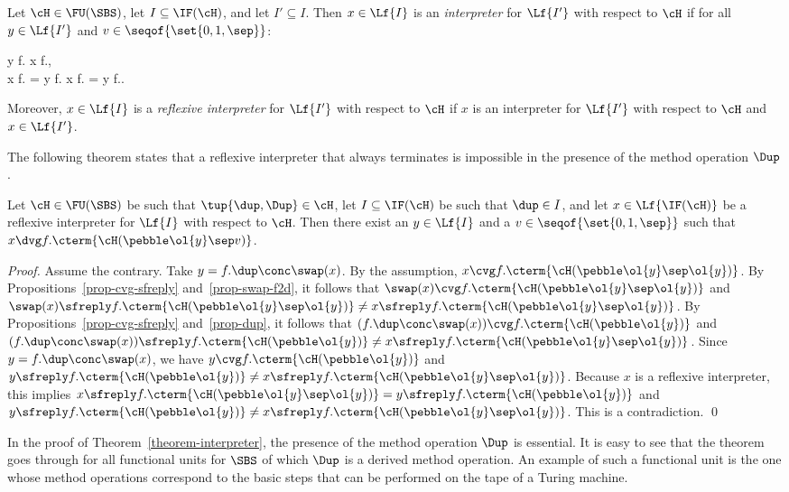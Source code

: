 \documentclass[fleqn]{llncs}
\begin{document}
Let $\cH \in \FU(\SBS)$, let $I \subseteq \IF(\cH)$, and
let $I' \subseteq I$.
Then $x \in \Lf{I}$ is an \emph{interpreter} for $\Lf{I'}$ with respect
to $\cH$ if for all $y \in \Lf{I'}$ and $v \in \seqof{\set{0,1,\sep}}$:
\begin{ldispl}
y \cvg f. \Implies
x \cvg f.\;, \\
x \sfapply f. =
y \sfapply f.\; \;
x \sfreply f. =
y \sfreply f.\;.
\end{ldispl}
Moreover, $x \in \Lf{I}$ is a \emph{reflexive interpreter} for $\Lf{I'}$
with respect to $\cH$ if $x$ is an interpreter for $\Lf{I'}$ with respect
to $\cH$ and $x \in \Lf{I'}$.

The following theorem states that a reflexive interpreter that always
terminates is impossible in the presence of the method operation $\Dup$.
\begin{theorem}
\label{theorem-interpreter}
Let $\cH \in \FU(\SBS)$ be such that $\tup{\dup,\Dup} \in \cH$,
let $I \subseteq \IF(\cH)$ be such that $\dup \in I$, and
let $x \in \Lf{\IF(\cH)}$ be a reflexive interpreter for $\Lf{I}$ with
respect to $\cH$.
Then there exist an $y \in \Lf{I}$ and a $v \in \seqof{\set{0,1,\sep}}$
such that $x \dvg f.\cterm{\cH(\pebble \ol{y} \sep v)}$.
\end{theorem}
\begin{proof}
Assume the contrary.
Take $y = f.\dup \conc \swap(x)$.
By the assumption, $x \cvg f.\cterm{\cH(\pebble \ol{y} \sep \ol{y})}$.
By Propositions~\ref{prop-cvg-sfreply} and~\ref{prop-swap-f2d}, it
follows that $\swap(x) \cvg f.\cterm{\cH(\pebble \ol{y} \sep \ol{y})}$
and
$\swap(x) \sfreply f.\cterm{\cH(\pebble \ol{y} \sep \ol{y})} \neq
 x \sfreply f.\cterm{\cH(\pebble \ol{y} \sep \ol{y})}$.
By Propositions~\ref{prop-cvg-sfreply} and~\ref{prop-dup}, it follows
that $(f.\dup \conc \swap(x)) \cvg f.\cterm{\cH(\pebble \ol{y})}$ and
$(f.\dup \conc \swap(x)) \sfreply f.\cterm{\cH(\pebble \ol{y})} \neq
 x \sfreply f.\cterm{\cH(\pebble \ol{y} \sep \ol{y})}$.
Since $y = f.\dup \conc \swap(x)$, we have
$y \cvg f.\cterm{\cH(\pebble \ol{y})}$ and
$y \sfreply f.\cterm{\cH(\pebble \ol{y})} \neq
 x \sfreply f.\cterm{\cH(\pebble \ol{y} \sep \ol{y})}$.
Because $x$ is a reflexive interpreter, this implies
$x \sfreply f.\cterm{\cH(\pebble \ol{y} \sep \ol{y})} =
 y \sfreply f.\cterm{\cH(\pebble \ol{y})}$ and
$y \sfreply f.\cterm{\cH(\pebble \ol{y})} \neq
 x \sfreply f.\cterm{\cH(\pebble \ol{y} \sep \ol{y})}$.
This is a contradiction.
\qed
\end{proof}
In the proof of Theorem~\ref{theorem-interpreter}, the presence of the
method operation $\Dup$ is essential.
It is easy to see that the theorem goes through for all functional units
for $\SBS$ of which $\Dup$ is a derived method operation.
An example of such a functional unit is the one whose method operations
correspond to the basic steps that can be performed on the tape of a
Turing machine.
\end{document}
